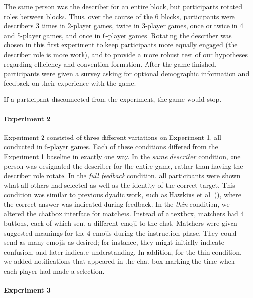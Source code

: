 \documentclass[
  english,
]{article}
\begin{document}
The same person was the describer for an entire block, but participants rotated roles between blocks.
Thus, over the course of the 6 blocks, participants were describers 3 times in 2-player games, twice in 3-player games, once or twice in 4 and 5-player games, and once in 6-player games.
Rotating the describer was chosen in this first experiment to keep participants more equally engaged (the describer role is more work), and to provide a more robust test of our hypotheses regarding efficiency and convention formation.
After the game finished, participants were given a survey asking for optional demographic information and feedback on their experience with the game.

If a participant disconnected from the experiment, the game would stop.

\paragraph{Experiment 2}

Experiment 2 consisted of three different variations on Experiment 1, all conducted in 6-player games.
Each of these conditions differed from the Experiment 1 baseline in exactly one way.
In the \emph{same describer} condition, one person was designated the describer for the entire game, rather than having the describer role rotate.
In the \emph{full feedback} condition, all participants were shown what all others had selected as well as the identity of the correct target.
This condition was similar to previous dyadic work, such as Hawkins et al. (), where the correct answer was indicated during feedback.
In the \emph{thin} condition, we altered the chatbox interface for matchers.
Instead of a textbox, matchers had 4 buttons, each of which sent a different emoji to the chat. Matchers were given suggested meanings for the 4 emojis during the instruction phase. They could send as many emojis as desired; for instance, they might initially indicate confusion, and later indicate understanding. In addition, for the thin condition, we added notifications that appeared in the chat box marking the time when each player had made a selection.

\paragraph{Experiment 3}
\end{document}
